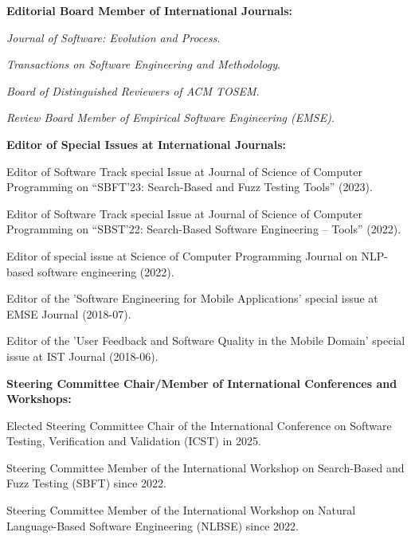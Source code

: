 \documentclass[11pt]{article}
\begin{document}
\medskip 

\textbf{Editorial Board Member of International Journals:}
\begin{innerlist}
   \item \emph{Journal of Software: Evolution and Process}.
   \item \emph{Transactions on Software Engineering and Methodology}.
   \item \emph{Board of Distinguished Reviewers of ACM TOSEM}.
   \item \emph{Review Board Member of Empirical Software Engineering (EMSE)}.
\end{innerlist}

\medskip 

\textbf{Editor of Special Issues at International Journals:}
\begin{innerlist}
   \item Editor of Software Track special Issue at Journal of Science of Computer Programming on ``SBFT'23: Search-Based and Fuzz Testing Tools'' (2023).
   \item Editor of Software Track special Issue at Journal of Science of Computer Programming on ``SBST’22: Search-Based Software Engineering – Tools'' (2022).
   \item Editor of special issue at Science of Computer Programming Journal on NLP-based software engineering (2022).
   \item Editor of the 'Software Engineering for Mobile Applications' special issue at EMSE Journal (2018-07).
   \item Editor of the 'User Feedback and Software Quality in the Mobile Domain' special issue at IST Journal (2018-06).
\end{innerlist}

\medskip 

\textbf{Steering Committee Chair/Member of International Conferences and Workshops:}
\begin{innerlist}
   \item Elected Steering Committee Chair of the International Conference on Software Testing, Verification and Validation (ICST) in 2025.
   \item Steering Committee Member of the International Workshop on Search-Based and Fuzz Testing (SBFT) since 2022.
   \item Steering Committee Member of the International Workshop on Natural Language-Based Software Engineering (NLBSE) since 2022.
\end{innerlist}
\end{document}
